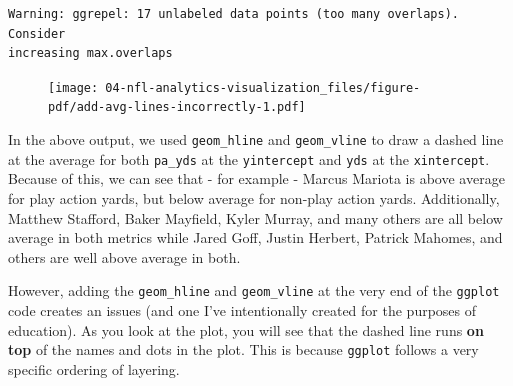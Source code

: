 \documentclass[
  letterpaper,
]{krantz}
\newenvironment{Shaded}{\begin{snugshade}}{\end{snugshade}}
\newcommand{\AttributeTok}[1]{\textcolor[rgb]{0.40,0.45,0.13}{#1}}
\newcommand{\DecValTok}[1]{\textcolor[rgb]{0.68,0.00,0.00}{#1}}
\newcommand{\FunctionTok}[1]{\textcolor[rgb]{0.28,0.35,0.67}{#1}}
\newcommand{\NormalTok}[1]{\textcolor[rgb]{0.00,0.23,0.31}{#1}}
\newcommand{\SpecialCharTok}[1]{\textcolor[rgb]{0.37,0.37,0.37}{#1}}
\newcommand{\StringTok}[1]{\textcolor[rgb]{0.13,0.47,0.30}{#1}}
\begin{document}
\begin{Shaded}
\end{Shaded}

\begin{verbatim}
Warning: ggrepel: 17 unlabeled data points (too many overlaps). Consider
increasing max.overlaps
\end{verbatim}

\begin{figure}[H]

{\centering \texttt{[image: 04-nfl-analytics-visualization\_files/figure-pdf/add-avg-lines-incorrectly-1.pdf]}

}

\end{figure}

In the above output, we used \texttt{geom\_hline} and
\texttt{geom\_vline} to draw a dashed line at the average for both
\texttt{pa\_yds} at the \texttt{yintercept} and \texttt{yds} at the
\texttt{xintercept}. Because of this, we can see that - for example -
Marcus Mariota is above average for play action yards, but below average
for non-play action yards. Additionally, Matthew Stafford, Baker
Mayfield, Kyler Murray, and many others are all below average in both
metrics while Jared Goff, Justin Herbert, Patrick Mahomes, and others
are well above average in both.

However, adding the \texttt{geom\_hline} and \texttt{geom\_vline} at the
very end of the \texttt{ggplot} code creates an issues (and one I've
intentionally created for the purposes of education). As you look at the
plot, you will see that the dashed line runs \textbf{on top} of the
names and dots in the plot. This is because \texttt{ggplot} follows a
very specific ordering of layering.
\end{document}
